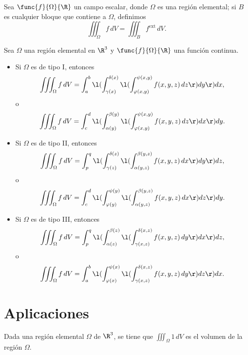 \documentclass[a4,11pt]{aleph-notas}
\begin{document}
\begin{defi}
    Sea $\func{f}{\Omega}{\R}$ un campo escalar, donde $\Omega$ es una región elemental; si $B$ es cualquier bloque que contiene a $\Omega$, definimos
    \[
        \iiint_\Omega f\, dV = \iiint_B f^{\text{ext}}\, dV.
    \]
\end{defi}

\begin{prop}
    Sea $\Omega$ una región elemental en $\R^3$ y $\func{f}{\Omega}{\R}$ una función continua.
    \begin{itemize}
        \item Si $\Omega$ es de tipo I, entonces
        \[
            \iiint_\Omega f\, dV = \int_a^b \l(\int_{\gamma(x)}^{\delta(x)} \l(\int_{\varphi(x,y)}^{\psi(x,y)} f(x,y,z)\, dz\r)dy\r)dx,
        \]
        o
        \[
            \iiint_\Omega f\, dV = \int_c^d \l(\int_{\alpha(y)}^{\beta(y)} \l(\int_{\varphi(x,y)}^{\psi(x,y)} f(x,y,z)\, dz\r)dx\r)dy.
        \]

        \item Si $\Omega$ es de tipo II, entonces
        \[
            \iiint_\Omega f\, dV = \int_p^q \l(\int_{\gamma(z)}^{\delta(z)} \l(\int_{\alpha(y,z)}^{\beta(y,z)} f(x,y,z)\, dx\r)dy\r)dz,
        \]
        o
        \[
            \iiint_\Omega f\, dV = \int_c^d \l(\int_{\varphi(y)}^{\psi(y)} \l(\int_{\alpha(y,z)}^{\beta(y,z)} f(x,y,z)\, dx\r)dz\r)dy.
        \]

        \item Si $\Omega$ es de tipo III, entonces
        \[
            \iiint_\Omega f\, dV = \int_p^q \l(\int_{\alpha(z)}^{\beta(z)} \l(\int_{\gamma(x,z)}^{\delta(x,z)} f(x,y,z)\, dy\r)dx\r)dz,
        \]
        o
        \[
            \iiint_\Omega f\, dV = \int_a^b \l(\int_{\varphi(x)}^{\psi(x)} \l(\int_{\gamma(x,z)}^{\delta(x,z)} f(x,y,z)\, dy\r)dz\r)dx.
        \]
    \end{itemize}
\end{prop}

\section{Aplicaciones}

\begin{advertencia}
    Dada una región elemental $\Omega$ de $\R^3$, se tiene que $\iiint_\Omega 1\, dV$ es el volumen de la región $\Omega$.
\end{advertencia}
\end{document}

